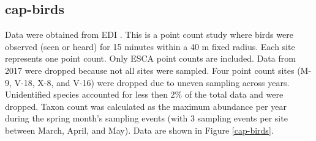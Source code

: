 \documentclass[11pt, oneside]{article}
\begin{document}
\subsection{cap-birds}
Data were obtained from EDI \citep{cap-birds}.
This is a point count study where birds were observed (seen or heard) for 15 minutes within a 40 m fixed radius. 
Each site represents one point count. 
Only ESCA point counts are included. 
Data from 2017 were dropped because not all sites were sampled. 
Four point count sites (M-9, V-18, X-8, and V-16) were dropped due to uneven sampling across years. 
Unidentified species accounted for less then 2\% of the total data and were dropped. 
Taxon count was calculated as the maximum abundance per year during the spring month's sampling events (with 3 sampling events per site between March, April, and May). 
Data are shown in Figure \ref{cap-birds}.
\end{document}
